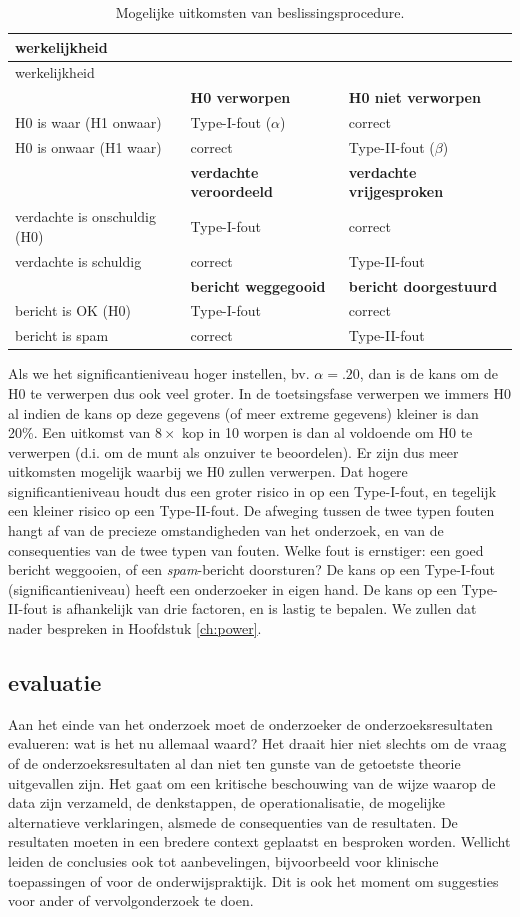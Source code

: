 \documentclass[
]{book}
\begin{document}
\begin{longtable}[]{@{}lll@{}}
\caption{\label{tab:H0H1uitkomsten} Mogelijke uitkomsten van beslissingsprocedure.}\tabularnewline
\toprule
werkelijkheid & &\tabularnewline
\midrule
\endfirsthead
\toprule
werkelijkheid & &\tabularnewline
\midrule
\endhead
& \textbf{H0 verworpen} & \textbf{H0 niet verworpen}\tabularnewline
H0 is waar (H1 onwaar) & Type-I-fout (\(\alpha\)) & correct\tabularnewline
H0 is onwaar (H1 waar) & correct & Type-II-fout (\(\beta\))\tabularnewline
& \textbf{verdachte veroordeeld} & \textbf{verdachte vrijgesproken}\tabularnewline
verdachte is onschuldig (H0) & Type-I-fout & correct\tabularnewline
verdachte is schuldig & correct & Type-II-fout\tabularnewline
& \textbf{bericht weggegooid} & \textbf{bericht doorgestuurd}\tabularnewline
bericht is OK (H0) & Type-I-fout & correct\tabularnewline
bericht is spam & correct & Type-II-fout\tabularnewline
\bottomrule
\end{longtable}

Als we het significantieniveau hoger instellen, bv. \(\alpha = .20\), dan
is de kans om de H0 te verwerpen dus ook veel groter. In de
toetsingsfase verwerpen we immers H0 al indien de kans op deze gegevens
(of meer extreme gegevens) kleiner is dan 20\%. Een uitkomst van
\(8\times\) kop in 10 worpen is dan al voldoende om H0 te verwerpen (d.i.
om de munt als onzuiver te beoordelen). Er zijn dus meer uitkomsten
mogelijk waarbij we H0 zullen verwerpen. Dat hogere significantieniveau
houdt dus een groter risico in op een Type-I-fout, en tegelijk een
kleiner risico op een Type-II-fout. De afweging tussen de twee typen
fouten hangt af van de precieze omstandigheden van het onderzoek, en van
de consequenties van de twee typen van fouten. Welke fout is ernstiger:
een goed bericht weggooien, of een \emph{spam}-bericht doorsturen? De kans op
een Type-I-fout (significantieniveau) heeft een onderzoeker in eigen
hand. De kans op een Type-II-fout is afhankelijk van drie factoren, en
is lastig te bepalen. We zullen dat nader bespreken in
Hoofdstuk \ref{ch:power}.

\hypertarget{evaluatie}{%
\subsection{evaluatie}\label{evaluatie}}

Aan het einde van het onderzoek moet de onderzoeker de
onderzoeksresultaten evalueren: wat is het nu allemaal waard? Het draait
hier niet slechts om de vraag of de onderzoeksresultaten al dan niet ten
gunste van de getoetste theorie uitgevallen zijn. Het gaat om een
kritische beschouwing van de wijze waarop de data zijn verzameld, de
denkstappen, de operationalisatie, de mogelijke alternatieve
verklaringen, alsmede de consequenties van de resultaten. De resultaten
moeten in een bredere context geplaatst en besproken worden. Wellicht
leiden de conclusies ook tot aanbevelingen, bijvoorbeeld voor klinische
toepassingen of voor de onderwijspraktijk. Dit is ook het moment om
suggesties voor ander of vervolgonderzoek te doen.
\end{document}
